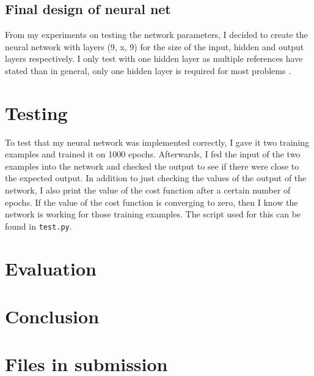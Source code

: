 \documentclass{article}
\begin{document}
\subsection{Final design of neural net}
From my experiments on testing the network parameters, I decided to create the neural network with layers (9, x, 9) for the size of the input, hidden and output layers respectively. I only test with one hidden layer as multiple references have stated than in general, only one hidden layer is required for most problems \cite{faq}.
\section{Testing}
To test that my neural network was implemented correctly, I gave it two training examples and trained it on 1000 epochs. Afterwards, I fed the input of the two examples into the network and checked the output to see if there were close to the expected output. In addition to just checking the values of the output of the network, I also print the value of the cost function after a certain number of epochs. If the value of the cost function is converging to zero, then I know the network is working for those training examples. The script used for this can be found in \texttt{test.py}. 
\section{Evaluation}

\section{Conclusion}



\section{Files in submission}

\printbibliography
\end{document}
